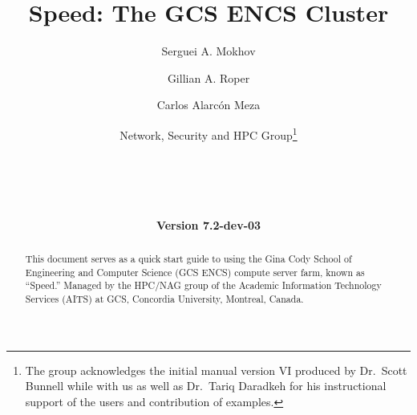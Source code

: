 \documentclass{easychair}
\begin{document}
%
\title{Speed: The GCS ENCS Cluster}

%

\date{\textbf{Version 7.2-dev-03}}

%
\author{
    Serguei A. Mokhov
\and
    Gillian A. Roper
\and
    Carlos Alarcón Meza
\and
    Network, Security and HPC Group\footnote{The group acknowledges the initial manual version VI produced by Dr.~Scott Bunnell while with us
		as well as Dr.~Tariq Daradkeh for his instructional support of the users and contribution of examples.}\\
    \\
    \\
    \\
    \\
}

%

\maketitle

\begin{abstract}
This document serves as a quick start guide to using the Gina Cody School of Engineering and Computer Science (GCS ENCS) 
compute server farm, known as ``Speed.'' Managed by the HPC/NAG group of the 
Academic Information Technology Services (AITS) at GCS, Concordia University, Montreal, Canada.
\end{abstract}
\end{document}
